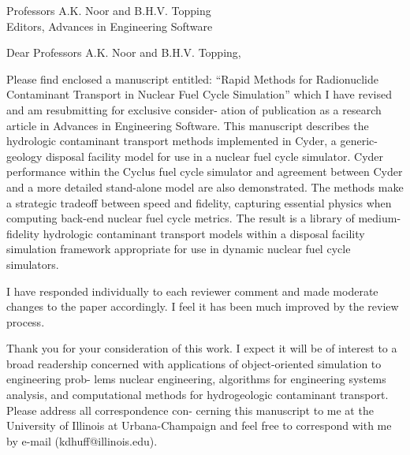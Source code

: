 \documentclass[11pt]{letter} %
\newcommand{\RecipientName}{Professors A.K. Noor and B.H.V. Topping\xspace}
\newcommand{\RecipientAddress}{Editors, Advances in Engineering Software\xspace}
\begin{document}
\begin{letter}{\RecipientName \\
        \RecipientAddress}

\address{Kathryn D. Huff\\
118 Talbot Laboratory\\
104 Wright Street\\
MC-234\\
Urbana, IL 61801}


\opening{Dear \RecipientName,}
Please find enclosed a manuscript entitled: ``Rapid Methods for Radionuclide Contaminant
Transport in Nuclear Fuel Cycle Simulation'' which I have revised and am resubmitting for exclusive consider-
ation of publication as a research article in Advances in Engineering Software.
This manuscript describes the hydrologic contaminant transport methods implemented in
Cyder, a generic-geology disposal facility model for use in a nuclear fuel cycle simulator.
Cyder performance within the Cyclus fuel cycle simulator and agreement between Cyder and
a more detailed stand-alone model are also demonstrated. The methods make a strategic
tradeoff between speed and fidelity, capturing essential physics when computing back-end
nuclear fuel cycle metrics. The result is a library of medium-fidelity hydrologic contaminant
transport models within a disposal facility simulation framework appropriate for use in
dynamic nuclear fuel cycle simulators.

I have responded individually to each reviewer comment and made moderate changes to the paper accordingly. I feel it has been much improved by the review process. 

Thank you for your consideration of this work. I expect it will be of interest to a broad
readership concerned with applications of object-oriented simulation to engineering prob-
lems nuclear engineering, algorithms for engineering systems analysis, and computational
methods for hydrogeologic contaminant transport. Please address all correspondence con-
cerning this manuscript to me at the University of Illinois at Urbana-Champaign and feel
free to correspond with me by e-mail (kdhuff@illinois.edu).


\end{letter}
\end{document}
